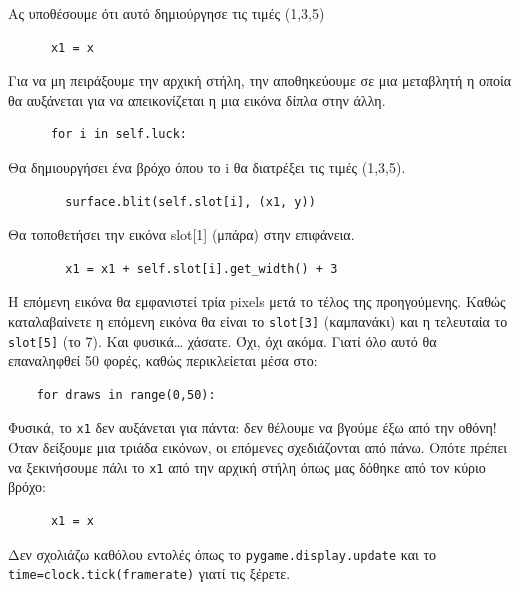Ας υποθέσουμε ότι αυτό δημιούργησε τις τιμές (1,3,5)

\begin{verbatim}
      x1 = x
\end{verbatim}

Για να μη πειράξουμε την αρχική στήλη, την αποθηκεύουμε σε μια μεταβλητή η οποία θα αυξάνεται για να απεικονίζεται η μια εικόνα δίπλα στην άλλη.

\begin{verbatim}
      for i in self.luck:
\end{verbatim}

Θα δημιουργήσει ένα βρόχο όπου το i θα διατρέξει τις τιμές (1,3,5).

\begin{verbatim}
        surface.blit(self.slot[i], (x1, y))
\end{verbatim}

Θα τοποθετήσει την εικόνα slot[1] (μπάρα) στην επιφάνεια.

\begin{verbatim}
        x1 = x1 + self.slot[i].get_width() + 3
\end{verbatim}

Η επόμενη εικόνα θα εμφανιστεί τρία pixels μετά το τέλος της προηγούμενης.
Καθώς καταλαβαίνετε η επόμενη εικόνα θα είναι το {\tt slot[3]} (καμπανάκι) και η τελευταία το {\tt slot[5]} (το 7). Και φυσικά\ldots{} χάσατε. Όχι, όχι ακόμα. Γιατί όλο αυτό θα επαναληφθεί 50 φορές, καθώς περικλείεται μέσα στο:

\begin{verbatim}
    for draws in range(0,50):
\end{verbatim}

Φυσικά, το {\tt x1} δεν αυξάνεται για πάντα: δεν θέλουμε να βγούμε έξω από
την οθόνη! Όταν δείξουμε μια τριάδα εικόνων, οι επόμενες σχεδιάζονται από
πάνω. Οπότε πρέπει να ξεκινήσουμε πάλι το {\tt x1} από την αρχική στήλη όπως μας δόθηκε από τον κύριο βρόχο:

\begin{verbatim}
      x1 = x
\end{verbatim}

Δεν σχολιάζω καθόλου εντολές όπως το {\tt pygame.display.update} και το {\tt time=clock.tick(framerate)} γιατί τις ξέρετε.

